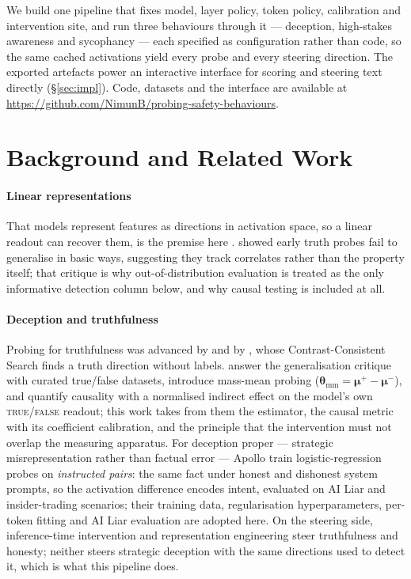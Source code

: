 \documentclass[conference]{IEEEtran}
\begin{document}
We build one pipeline that fixes model, layer policy, token policy, calibration
and intervention site, and run three behaviours through it --- deception,
high-stakes awareness and sycophancy --- each specified as configuration rather
than code, so the same cached activations yield every probe and every steering
direction. The exported artefacts power an interactive interface for scoring
and steering text directly (§\ref{sec:impl}). Code, datasets and the interface
are available at \url{https://github.com/NimunB/probing-safety-behaviours}.

\section{Background and Related Work}
\label{sec:related}

\paragraph{Linear representations}
That models represent features as directions in activation space, so a linear
readout can recover them, is the premise here \citep{alain2018,elhage2022}.
\citet{levinstein2024} showed early truth probes fail to generalise in basic
ways, suggesting they track correlates rather than the property itself; that
critique is why out-of-distribution evaluation is treated as the only informative
detection column below, and why causal testing is included at all.

\paragraph{Deception and truthfulness}
Probing for truthfulness was advanced by \citet{azaria2023} and by
\citet{burns2023}, whose Contrast-Consistent Search finds a truth direction
without labels. \citet{marks2024} answer the generalisation critique with curated
true/false datasets, introduce mass-mean probing
($\boldsymbol{\theta}_{\mathrm{mm}} = \boldsymbol{\mu}^{+} -
\boldsymbol{\mu}^{-}$), and quantify causality with a normalised indirect effect
on the model's own \textsc{true}/\textsc{false} readout; this work takes from
them the estimator, the causal metric with its coefficient calibration, and the
principle that the intervention must not overlap the measuring apparatus. For
deception proper ---
strategic misrepresentation rather than factual error --- Apollo
\citep{goldowsky2025} train logistic-regression probes on \emph{instructed
pairs}: the same fact under honest and dishonest system prompts, so the
activation difference encodes intent, evaluated on AI Liar
\citep{pacchiardi2024} and insider-trading \citep{scheurer2023} scenarios; their
training data, regularisation hyperparameters, per-token fitting and AI Liar
evaluation are adopted here. On
the steering side, inference-time intervention \citep{li2023} and
representation engineering \citep{zou2023} steer truthfulness and honesty;
neither steers strategic deception with the same directions used to detect it,
which is what this pipeline does.
\end{document}
